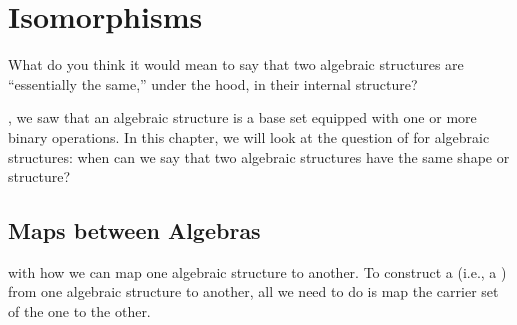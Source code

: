 \documentclass[../../../main.tex]{subfiles}
\begin{document}
\chapter{Isomorphisms}
\label{ch:algebra-isomorphisms}

\begin{ponder}
  What do you think it would mean to say that two algebraic structures are ``essentially the same,'' under the hood, in their internal structure?
\end{ponder}

, we saw that an algebraic structure is a base set equipped with one or more binary operations. In this chapter, we will look at the question of  for algebraic structures: when can we say that two algebraic structures have the same shape or structure?


\section{Maps between Algebras}

 with how we can map one algebraic structure to another. To construct a  (i.e., a ) from one algebraic structure to another, all we need to do is map the carrier set of the one to the other.
\end{document}

